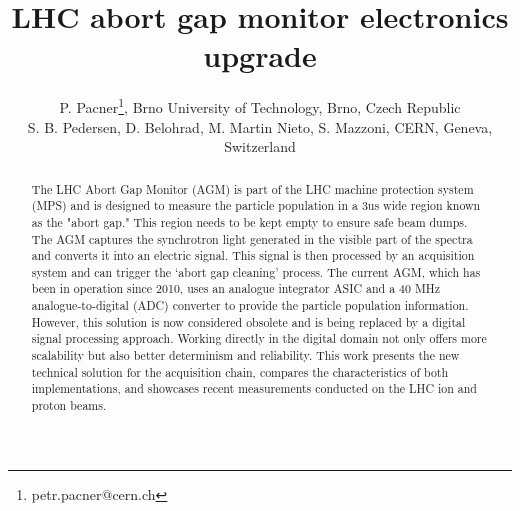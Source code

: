 



\title{LHC abort gap monitor electronics upgrade}

\author{P. Pacner\thanks{petr.pacner@cern.ch}, Brno University of Technology, Brno, Czech Republic \\
		S. B. Pedersen, D. Belohrad, M. Martin Nieto, S. Mazzoni, CERN, Geneva, Switzerland}
	
\maketitle

\begin{abstract}
    The LHC Abort Gap Monitor (AGM) is part of the LHC machine protection
    system (MPS) and is designed to measure the particle population in a 3us
    wide region known as the "abort gap." This region needs to be kept empty to
    ensure safe beam dumps. The AGM captures the synchrotron light generated in
    the visible part of the spectra and converts it into an electric signal.
    This signal is then processed by an acquisition system and can trigger the
    ‘abort gap cleaning’ process. The current AGM, which has been in operation
    since 2010, uses an analogue integrator ASIC and a 40 MHz
    analogue-to-digital (ADC) converter to provide the particle population
    information. However, this solution is now considered obsolete and is being
    replaced by a digital signal processing approach. Working directly in the
    digital domain not only offers more scalability but also better determinism
    and reliability. This work presents the new technical solution for the
    acquisition chain, compares the characteristics of both implementations,
    and showcases recent measurements conducted on the LHC ion and proton
    beams.
\end{abstract}

